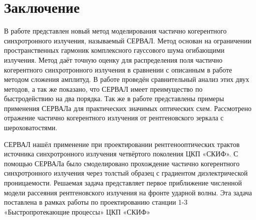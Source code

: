 \chapter*{Заключение}						%


В работе представлен новый метод моделирования частично когерентного синхротронного излучения, называемый СЕРВАЛ. Метод основан на ограничении пространственных гармоник комплексного гауссового шума огибающими излучения. Метод даёт точную оценку для распределения поля частично когерентного синхротронного излучения в сравнении с описанным в работе методом сложения амплитуд. В работе проведён сравнительный анализ этих двух методов, а так же показано, что СЕРВАЛ имеет преимущество по быстродействию на два порядка. Так же в работе представлены примеры применения СЕРВАЛа для практических значимых оптических схем. Рассмотрено отражение частично когерентного излучения от рентгеновского зеркала с шероховатостями. 

СЕРВАЛ нашёл применение при проектировании рентгенооптических трактов источника синхротронного излучения четвёртого поколения ЦКП «СКИФ». С помощью СЕРВАЛа было смоделировано прохождение частично когерентного синхротронного излучения через толстый образец с градиентом диэлектрической проницаемости. Решаемая задача представляет первое приближение численной модели рассеяния рентгеновского излучения на фронте ударной волны. Эта задача поставлена в рамках работы по проектированию станции 1-3 «Быстропротекающие процессы» ЦКП «СКИФ»

%
